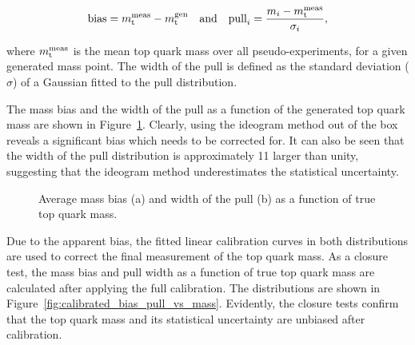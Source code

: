 \begin{equation}
 \textrm{bias} = m_\mathrm{t}^{\rm meas} - m_\mathrm{t}^{\rm gen} \quad \text{and} \quad
 \textrm{pull}_i = \frac{m_i - m_\mathrm{t}^{\rm meas}}{\sigma_i},
\label{eq:bias_pull}
\end{equation}

where $m_\mathrm{t}^{\rm meas}$ is the mean top quark mass over all pseudo-experiments, for a given generated mass point. The
width of the pull is defined as the standard deviation ($\sigma$) of a Gaussian fitted to the pull distribution.

The mass bias and the width of the pull as a function of the generated top quark mass are shown in
Figure~\ref{fig:bias_pull_vs_mass}. Clearly, using the ideogram method out of the box reveals a significant bias which
needs to be corrected for. It can also be seen that the width of the pull distribution is approximately \SI{11}{\pc}
larger than unity, suggesting that the ideogram method underestimates the statistical uncertainty.


\begin{figure}[!htp]
   \caption{Average mass bias (a) and width of the pull (b) as a function of true top quark mass.
   \label{fig:bias_pull_vs_mass}}
\end{figure}

Due to the apparent bias, the fitted linear calibration curves in both distributions are used to correct the final
measurement of the top quark mass. As a closure test, the mass bias and pull width as a function of true top quark mass
are calculated after applying the full calibration. The distributions are shown in
Figure~\ref{fig:calibrated_bias_pull_vs_mass}. Evidently, the closure tests confirm that the top quark mass and its
statistical uncertainty are unbiased after calibration.

